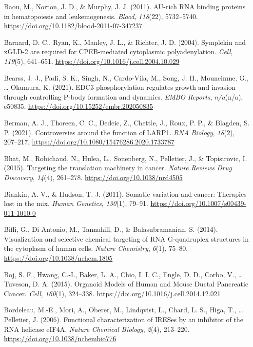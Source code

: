 \documentclass[12pt,openany]{book}
\begin{document}
\hypertarget{ref-Baou2011}{}
Baou, M., Norton, J. D., \& Murphy, J. J. (2011). AU-rich RNA binding
proteins in hematopoiesis and leukemogenesis. \emph{Blood},
\emph{118}(22), 5732--5740.
\url{https://doi.org/10.1182/blood-2011-07-347237}

\hypertarget{ref-Barnard2004}{}
Barnard, D. C., Ryan, K., Manley, J. L., \& Richter, J. D. (2004).
Symplekin and xGLD-2 are required for CPEB-mediated cytoplasmic
polyadenylation. \emph{Cell}, \emph{119}(5), 641--651.
\url{https://doi.org/10.1016/j.cell.2004.10.029}

\hypertarget{ref-Bearss2021}{}
Bearss, J. J., Padi, S. K., Singh, N., Cardo-Vila, M., Song, J. H.,
Mouneimne, G., \ldots{} Okumura, K. (2021). EDC3 phosphorylation
regulates growth and invasion through controlling P-body formation and
dynamics. \emph{EMBO Reports}, \emph{n/a}(n/a), e50835.
\url{https://doi.org/10.15252/embr.202050835}

\hypertarget{ref-Berman2021}{}
Berman, A. J., Thoreen, C. C., Dedeic, Z., Chettle, J., Roux, P. P., \&
Blagden, S. P. (2021). Controversies around the function of LARP1.
\emph{RNA Biology}, \emph{18}(2), 207--217.
\url{https://doi.org/10.1080/15476286.2020.1733787}

\hypertarget{ref-Bhat2015}{}
Bhat, M., Robichaud, N., Hulea, L., Sonenberg, N., Pelletier, J., \&
Topisirovic, I. (2015). Targeting the translation machinery in cancer.
\emph{Nature Reviews Drug Discovery}, \emph{14}(4), 261--278.
\url{https://doi.org/10.1038/nrd4505}

\hypertarget{ref-Biankin2011}{}
Biankin, A. V., \& Hudson, T. J. (2011). Somatic variation and cancer:
Therapies lost in the mix. \emph{Human Genetics}, \emph{130}(1), 79--91.
\url{https://doi.org/10.1007/s00439-011-1010-0}

\hypertarget{ref-Biffi2014}{}
Biffi, G., Di Antonio, M., Tannahill, D., \& Balasubramanian, S. (2014).
Visualization and selective chemical targeting of RNA G-quadruplex
structures in the cytoplasm of human cells. \emph{Nature Chemistry},
\emph{6}(1), 75--80. \url{https://doi.org/10.1038/nchem.1805}

\hypertarget{ref-Boj2015}{}
Boj, S. F., Hwang, C.-I., Baker, L. A., Chio, I. I. C., Engle, D. D.,
Corbo, V., \ldots{} Tuveson, D. A. (2015). Organoid Models of Human and
Mouse Ductal Pancreatic Cancer. \emph{Cell}, \emph{160}(1), 324--338.
\url{https://doi.org/10.1016/j.cell.2014.12.021}

\hypertarget{ref-Bordeleau2006}{}
Bordeleau, M.-E., Mori, A., Oberer, M., Lindqvist, L., Chard, L. S.,
Higa, T., \ldots{} Pelletier, J. (2006). Functional characterization of
IRESes by an inhibitor of the RNA helicase eIF4A. \emph{Nature Chemical
Biology}, \emph{2}(4), 213--220.
\url{https://doi.org/10.1038/nchembio776}
\end{document}
